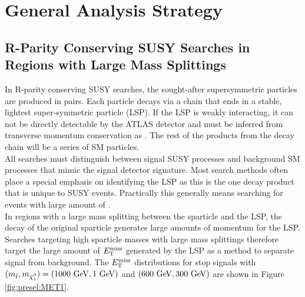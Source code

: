 \chapter{General Analysis Strategy}
\label{chap:AnaStrategy}
\section{ R-Parity Conserving SUSY Searches in Regions with Large Mass Splittings }

\indent In R-parity conserving SUSY searches, the sought-after supersymmetric particles are produced in pairs.  Each particle decays via a chain that ends in a stable, lightest super-symmetric particle (LSP).  If the LSP is weakly interacting, it can not be directly detectable by the ATLAS detector and must be inferred from transverse momentum conservation as \MET.  The rest of the products from the decay chain will be a series of SM particles.  ~\\

\indent All searches must distinguish between signal SUSY processes and background SM processes that mimic the signal detector signature.  Most search methods often place a special emphasis on identifying the LSP as this is the one decay product that is unique to SUSY events.  Practically this generally means searching for events with large amount of \MET.  \\

\indent In regions with a large mass splitting between the sparticle and the LSP, the decay of the original sparticle generates large amounts of momentum for the LSP.  Searches targeting high sparticle masses with large mass splittings therefore target the large amount of $E_{\mathrm{T}}^{\mathrm{miss}}$ generated by the LSP as a method to separate signal from background. The $E_{\mathrm{T}}^{\mathrm{miss}}$ distributions for stop signals with $(m_{\stop}, m_{\ninoone}) = (1000 \gev,1 \gev)$ and $(600 \gev, 300 \gev)$ are shown in Figure \ref{fig:presel:MET1}. ~\\

